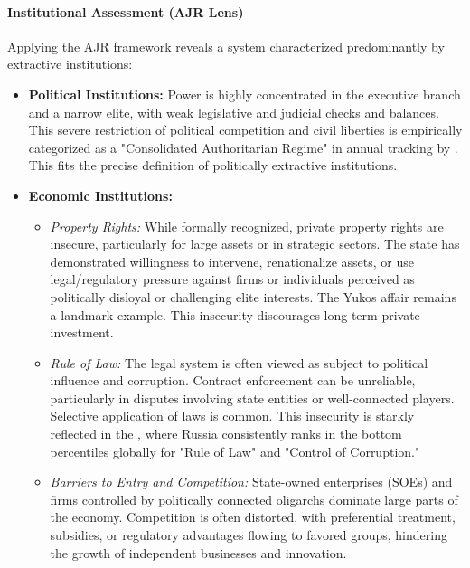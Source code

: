 \paragraph{Institutional Assessment (AJR Lens)}
Applying the AJR framework reveals a system characterized predominantly by extractive institutions:
\begin{itemize}
    \item \textbf{Political Institutions:} Power is highly concentrated in the executive branch and a narrow elite, with weak legislative and judicial checks and balances. This severe restriction of political competition and civil liberties is empirically categorized as a "Consolidated Authoritarian Regime" in annual tracking by \textcite{freedomhouse2024transit}. This fits the precise definition of politically extractive institutions.
    \item \textbf{Economic Institutions:}
          \begin{itemize}
              \item \textit{Property Rights:} While formally recognized, private property rights are insecure, particularly for large assets or in strategic sectors. The state has demonstrated willingness to intervene, renationalize assets, or use legal/regulatory pressure against firms or individuals perceived as politically disloyal or challenging elite interests. The Yukos affair remains a landmark example. This insecurity discourages long-term private investment.
              \item \textit{Rule of Law:} The legal system is often viewed as subject to political influence and corruption. Contract enforcement can be unreliable, particularly in disputes involving state entities or well-connected players. Selective application of laws is common. This insecurity is starkly reflected in the \textcite{worldbank2024wgi}, where Russia consistently ranks in the bottom percentiles globally for "Rule of Law" and "Control of Corruption."
              \item \textit{Barriers to Entry and Competition:} State-owned enterprises (SOEs) and firms controlled by politically connected oligarchs dominate large parts of the economy. Competition is often distorted, with preferential treatment, subsidies, or regulatory advantages flowing to favored groups, hindering the growth of independent businesses and innovation. 
              

\end{itemize}
\end{itemize}
